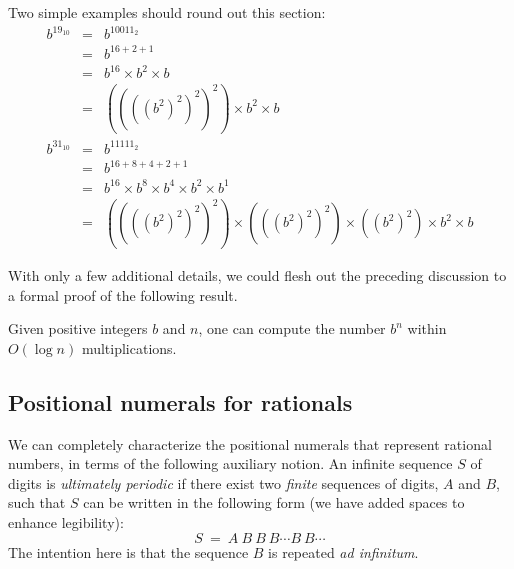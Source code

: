 Two simple examples should round out this section:
\begin{eqnarray*}
b^{19_{10}} & = & b^{10011_{2}} \\
        & = & b^{16 + 2 + 1} \\
        & = & b^{16} \times b^2 \times b \\
        & = & ((((b^2)^2)^2)^2) \times b^2 \times b \\
b^{31_{10}} & = & b^{11111_{2}} \\
    & = & b^{16 + 8 + 4 + 2 + 1} \\
    & = & b^{16} \times b^8 \times b^4 \times b^2 \times b^1 \\
    & = & ((((b^2)^2)^2)^2) \times (((b^2)^2)^2) \times ((b^2)^2) \times b^2 \times b
\end{eqnarray*} 


With only a few additional details, we could flesh out the preceding
discussion to a formal proof of the following result.


\begin{prop}
\label{thm:fast-exponentiation}
Given positive integers $b$ and $n$, one can compute the number $b^n$
within $O(\log n)$ multiplications.
\end{prop}




\subsection{Positional numerals for rationals}
\label{sec:special-numerals-Q}

We can completely characterize the positional numerals that represent
rational numbers, in terms of the following auxiliary notion.
An infinite sequence $S$ of digits is {\em ultimately periodic} if
there exist two {\em finite} sequences of digits, $A$ and $B$, such
that $S$ can be written in the following form (we have added spaces to
enhance legibility):
\begin{equation}
\label{eq:ult-per-seq}
 S \ = \ A \ B \ B \ B \cdots B \ B \cdots
\end{equation}
The intention here is that the sequence $B$ is repeated {\it ad
  infinitum}.


